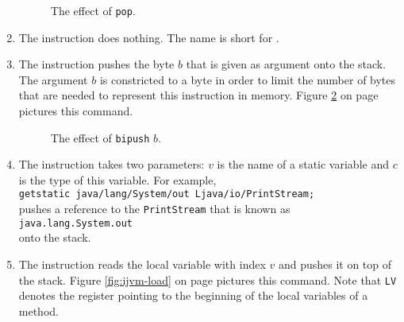 \begin{enumerate}
\begin{figure}[!ht]
{\begin{picture}
\end{picture}}
  \caption{The effect of \texttt{pop}.}
  \label{fig:ijvm-pop}
\end{figure}

\item The instruction 
      does nothing.  The name is short for .
\item The instruction 
      pushes the byte $b$ that is given as argument onto the stack.
      The argument $b$ is constricted to a byte in order to limit the number of bytes that are needed to
      represent this instruction in memory.
      Figure \ref{fig:ijvm-bipush} on page \pageref{fig:ijvm-bipush} pictures this command.
      
      
\setlength{\unitlength}{0.5cm}
\begin{figure}[!ht]
  \centering
{}
  \caption{The effect of \texttt{bipush} $b$.}
  \label{fig:ijvm-bipush}
\end{figure}
 

\item The instruction 
      takes two parameters:  $v$ is the name of a static variable and $c$ is the type of this variable.
      For example,  
      \\[0.2cm]
      \hspace*{1.3cm}
      \texttt{getstatic java/lang/System/out Ljava/io/PrintStream;}
      \\[0.2cm] 
      pushes a reference to the \texttt{PrintStream} that is known as 
      \\[0.2cm]
      \hspace*{1.3cm}
      \texttt{java.lang.System.out}
      \\[0.2cm]
      onto the stack.
\item The instruction 
      reads the local variable with index  $v$ and pushes it on top of the stack.
      Figure \ref{fig:ijvm-load} on page \pageref{fig:ijvm-load} pictures this command.
      Note that \texttt{LV} denotes the register pointing to the beginning of the local variables of a
      method. 


\end{enumerate}
